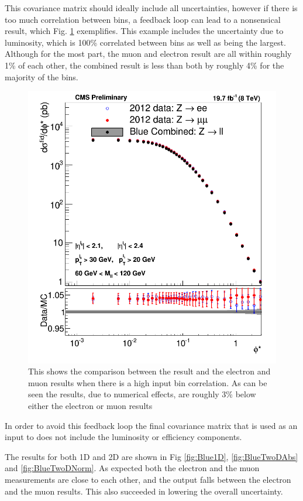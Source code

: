 This covariance matrix should ideally include all uncertainties, however if there is too much correlation between bins, a feedback loop can lead to a nonsensical result, which Fig. \ref{fig:BrokeBlue} exemplifies.  This example includes the uncertainty due to luminosity, which is 100\% correlated between bins as well as being the largest. Although for the most part, the muon and electron result are all within roughly 1\% of each other, the combined result is less than both by roughly 4\% for the majority of the bins. 
\begin{figure}
    \centering
    \includegraphics[width=\linewidth]{figures/Results/BlueCorrilationProblems.png}
    \caption[\BLUE results with high correlation]{This shows the comparison between the \BLUE result and the electron and muon results when there is a high input bin correlation. As can be seen the \BLUE results, due to numerical effects, are roughly 3\% below either the electron or muon results}
    \label{fig:BrokeBlue}
\end{figure}
In order to avoid this feedback loop the final covariance matrix that is used as an input to \BLUE does not include the luminosity or efficiency components.

The results for both 1D and 2D are shown in Fig \ref{fig:Blue1D},  \ref{fig:BlueTwoDAbs} and  \ref{fig:BlueTwoDNorm}. As expected both the electron and the muon measurements are close to each other, and the \BLUE output falls between the electron and the muon results. This also succeeded in lowering the overall uncertainty.   


